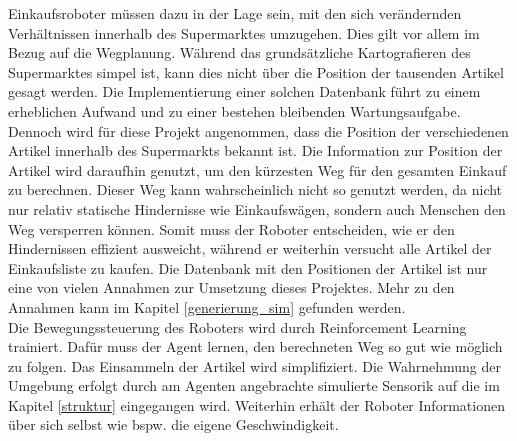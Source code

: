 Einkaufsroboter müssen dazu in der Lage sein, mit den sich verändernden Verhältnissen innerhalb des Supermarktes umzugehen. Dies gilt vor allem im Bezug auf die Wegplanung. Während das grundsätzliche Kartografieren des Supermarktes simpel ist, kann dies nicht über die Position der tausenden Artikel gesagt werden. Die Implementierung einer solchen Datenbank führt zu einem erheblichen Aufwand und zu einer bestehen bleibenden Wartungsaufgabe. Dennoch wird für diese Projekt angenommen, dass die Position der verschiedenen Artikel innerhalb des Supermarkts bekannt ist. Die Information zur Position der Artikel wird daraufhin genutzt, um den kürzesten Weg für den gesamten Einkauf zu berechnen. Dieser Weg kann wahrscheinlich nicht so genutzt werden, da nicht nur relativ statische Hindernisse wie Einkaufswägen, sondern auch Menschen den Weg versperren können. Somit muss der Roboter entscheiden, wie er den Hindernissen effizient ausweicht, während er weiterhin versucht alle Artikel der Einkaufsliste zu kaufen. Die Datenbank mit den Positionen der Artikel ist nur eine von vielen Annahmen zur Umsetzung dieses Projektes. Mehr zu den Annahmen kann im Kapitel \ref{generierung_sim} gefunden werden.
\\
Die Bewegungssteuerung des Roboters wird durch Reinforcement Learning trainiert. Dafür muss der Agent lernen, den berechneten Weg so gut wie möglich zu folgen. Das Einsammeln der Artikel wird simplifiziert. Die Wahrnehmung der Umgebung erfolgt durch am Agenten angebrachte simulierte Sensorik auf die im Kapitel \ref{struktur} eingegangen wird. Weiterhin erhält der Roboter Informationen über sich selbst wie bspw. die eigene Geschwindigkeit. 
